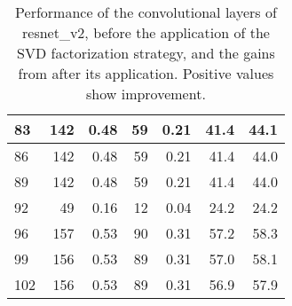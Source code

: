 \begin{table}
\begin{tabular}{|l|r|r|r|r|r|r|}
83 & 142 & 0.48 & 59 & 0.21 & 41.4 & 44.1 \\\hline
86 & 142 & 0.48 & 59 & 0.21 & 41.4 & 44.0 \\\hline
89 & 142 & 0.48 & 59 & 0.21 & 41.4 & 44.0 \\\hline
92 & 49 & 0.16 & 12 & 0.04 & 24.2 & 24.2 \\\hline
96 & 157 & 0.53 & 90 & 0.31 & 57.2 & 58.3 \\\hline
99 & 156 & 0.53 & 89 & 0.31 & 57.0 & 58.1 \\\hline
102 & 156 & 0.53 & 89 & 0.31 & 56.9 & 57.9 \\\hline
\end{tabular}
\caption{Performance of the convolutional layers of resnet\_v2, before the application of the SVD factorization strategy, and the gains from after its application. Positive values show improvement.}
\label{resnet_v2-performance}
\end{table}
